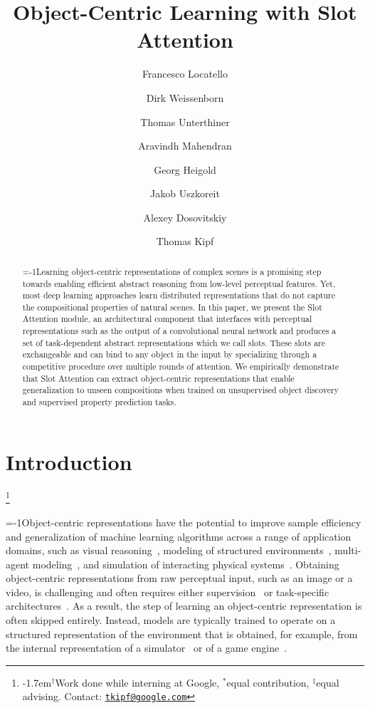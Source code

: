 \documentclass{article}
\title{Object-Centric Learning with Slot Attention}
\author[2,3,$\dagger$,*]{Francesco Locatello}
\author[1]{Dirk Weissenborn}
\author[1]{Thomas Unterthiner}
\author[1]{Aravindh Mahendran}
\author[1]{Georg Heigold}
\author[1]{Jakob Uszkoreit}
\author[1,$\ddagger$]{Alexey Dosovitskiy}
\author[1,$\ddagger$,*]{Thomas Kipf}
\affil[1]{Google Research, Brain Team}
\affil[2]{Dept.~of Computer Science, ETH Zurich}
\affil[3]{Max-Planck Institute for Intelligent Systems}
\newcommand\blfootnote[1]{%
  \begingroup
  \renewcommand\thefootnote{}\footnote{#1}%
  \addtocounter{footnote}{-1}%
  \endgroup
}
\begin{document}
\maketitle

\begin{abstract}
\looseness=-1Learning object-centric representations of complex scenes is a promising step towards enabling efficient abstract reasoning from low-level perceptual features. Yet, most deep learning approaches learn distributed representations that do not capture the compositional properties of natural scenes. In this paper, we present the Slot Attention module, an architectural component that interfaces with perceptual representations such as the output of a convolutional neural network and produces a set of task-dependent abstract representations which we call slots. These slots are exchangeable and can bind to any object in the input by specializing through a competitive procedure over multiple rounds of attention. We empirically demonstrate that Slot Attention can extract object-centric representations that enable generalization to unseen compositions when trained on unsupervised object discovery and supervised property prediction tasks.
\end{abstract}


\section{Introduction}
\blfootnote{\kern-1.7em$^\dagger$Work done while interning at Google, $^*$equal contribution, $^\ddagger$equal advising. Contact: \href{mailto:tkipf@google.com}{\texttt{tkipf@google.com}}}%
\looseness=-1Object-centric representations have the potential to improve sample efficiency and generalization of machine learning algorithms across a range of application domains, such as visual reasoning~\citep{yi2019clevrer}, modeling of structured environments~\citep{kulkarni2019unsupervised}, multi-agent modeling~\citep{sun2019stochastic,berner2019dota,vinyals2019grandmaster}, and simulation of interacting physical systems~\citep{battaglia2016interaction,mrowca2018flexible,sanchez2020learning}. Obtaining object-centric representations from raw perceptual input, such as an image or a video, is challenging and often requires either supervision~\citep{watters2017visual,sun2019stochastic,yi2019clevrer,knyazev2020graph} or task-specific architectures~\citep{devin2018deep,kulkarni2019unsupervised}. As a result, the step of learning an object-centric representation is often skipped entirely. Instead, models are typically trained to operate on a structured representation of the environment that is obtained, for example, from the internal representation of a simulator~\citep{battaglia2016interaction,sanchez2020learning} or of a game engine~\citep{berner2019dota,vinyals2019grandmaster}.
\end{document}
